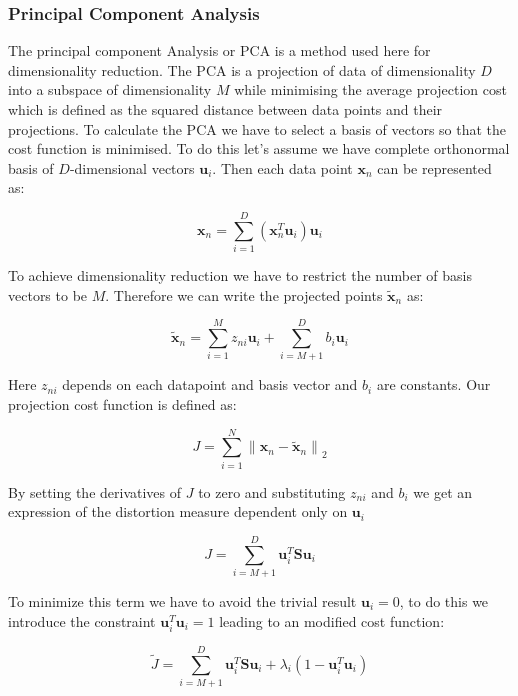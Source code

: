 \documentclass[cic,tc,english]{iiufrgs}
\newcommand{\norm}[1]{\left\lVert #1 \right\rVert_{2}}
\begin{document}
\subsubsection{Principal Component Analysis} \label{section:pca}
The principal component Analysis or PCA is a method used here for dimensionality reduction. The PCA is a projection of data of dimensionality $D$ into a subspace of dimensionality $M$ while minimising the average projection cost which is defined as the squared distance between data points and their projections. To calculate the PCA we have to select a basis of vectors so that the cost function is minimised. To do this let's assume we have complete orthonormal basis of $D$-dimensional vectors $\bm{u}_i$. Then each data point $\bm{x}_n$ can be represented as:

\begin{equation}
\bm{x}_n = \sum_{i = 1}^{D} (\bm{x}_n^T \bm{u}_i) \bm{u}_i
\end{equation}

To achieve dimensionality reduction we have to restrict the number of basis vectors to be $M$. Therefore we can write the projected points $\bm{\tilde{x}}_n$ as:

\begin{equation}
\bm{\tilde{x}}_n = \sum_{i = 1}^{M} z_{ni} \bm{u}_i + \sum_{i = M+1}^{D} b_{i} \bm{u}_i 
\end{equation}

Here $z_{ni}$ depends on each datapoint and basis vector and $b_{i}$ are constants. Our projection cost function is defined as:
 
\begin{equation}
J = \sum_{i = 1}^{N} \norm{\bm{x}_n - \bm{\tilde{x}}_n}
\end{equation}

By setting the derivatives of $J$ to zero and substituting $z_{ni}$ and $b_i$ we get an expression of the distortion measure dependent only on $\bm{u}_i$ \cite{bishop2006pattern}

\begin{equation} \label{cost_func}
J = \sum_{i = M+1}^{D} \bm{u}_i^T \bm{S} \bm{u}_i 
\end{equation}

To minimize this term we have to avoid the trivial result $\bm{u}_i = 0$, to do this we introduce the constraint $\bm{u}_i^T\bm{u}_i = 1$ leading to an modified cost function:

\begin{equation}
\tilde{J} = \sum_{i = M+1}^{D} \bm{u}_i^T \bm{S} \bm{u}_i  + \lambda_i (1-\bm{u}_i^T\bm{u}_i )
\end{equation}
\end{document}
